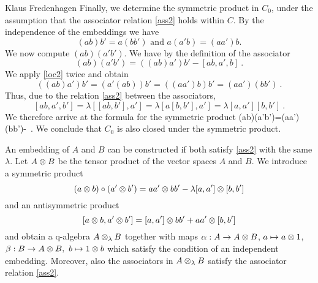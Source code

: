 \begin{artengenv}{Klaus Fredenhagen}
Finally, we determine the symmetric product in $C_0$, under the assumption that the associator relation \eqref{ass2} holds within $C$. By the independence of the embeddings we have
\[(ab)b'=a(bb')\text{ and }a(a'b)=(aa')b. \]
We now compute $(ab)(a'b')$. We have by the definition of the associator
\[(ab)(a'b')=((ab)a')b'-[ab,a',b]\ .\]
We apply \eqref{loc2} twice and obtain
\[((ab)a')b'=(a'(ab))b'=((aa')b)b'=(aa')(bb')\ .\]
Thus, due to the relation \eqref{ass2} between the associators,
\[[ab,a',b']=\lambda[[ab,b'],a']=\lambda [a[b,b'],a']=\lambda[a,a'][b,b']\ .\]
We therefore arrive at the formula for the symmetric product
\be\label{JordanC}(ab)(a'b')=(aa')(bb')-\lambda[a,a'][b,b']\ .\ee
We conclude that $C_0$ is also closed under the symmetric product. %

An embedding of $A$ and $B$ can be constructed if both satisfy \eqref{ass2} with the same $\lambda$. Let $A\otimes B$ be the tensor product of the vector spaces $A$ and $B$. We introduce a symmetric product
\[(a\otimes b)\circ(a'\otimes b')=a a'\otimes b b'-\lambda[a,a']\otimes[b,b']\]
and an antisymmetric product
\[[a\otimes b,a'\otimes b']=[a,a']\otimes b b'+a a'\otimes[b,b']\]
and obtain a q-algebra $A\otimes_\lambda B$ together with maps $\alpha:A\to A\otimes B$, $a\mapsto a\otimes 1$, $\beta:B\to A\otimes B,\ b\mapsto 1\otimes b$ which satisfy the condition of an independent embedding.
Moreover, also the associators in $A\otimes_{\lambda}B$ satisfy the associator relation \eqref{ass2}.


\end{artengenv}
